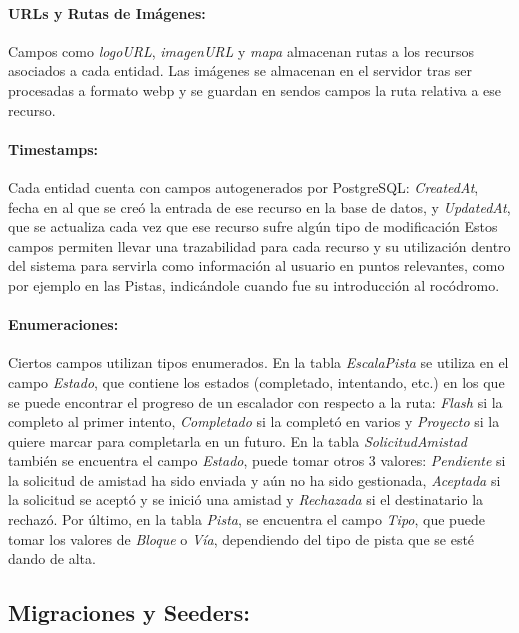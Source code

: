\paragraph{URLs y Rutas de Imágenes:} Campos como \textit{logoURL}, \textit{imagenURL} y \textit{mapa} almacenan 
rutas a los recursos asociados a cada entidad. Las imágenes se almacenan en el servidor tras ser procesadas 
a formato webp y se guardan en sendos campos la ruta relativa a ese recurso.

\paragraph{Timestamps:} Cada entidad cuenta con campos autogenerados por PostgreSQL: \textit{CreatedAt}, fecha en al que se creó la entrada de ese
recurso en la base de datos, y  \textit{UpdatedAt}, que se actualiza cada vez que ese recurso sufre algún tipo de modificación Estos campos permiten llevar una 
trazabilidad para cada recurso y su utilización dentro del sistema para servirla como información al usuario en puntos relevantes, como por ejemplo en las Pistas, 
indicándole cuando fue su introducción al rocódromo.

\paragraph{Enumeraciones:} Ciertos campos utilizan tipos enumerados. En la tabla \textit{EscalaPista} se utiliza en el campo \textit{Estado}, que contiene los estados  (completado, intentando, etc.) 
en los que se puede encontrar el progreso de un escalador con respecto a la ruta: \textit{Flash} si la completo al primer intento, \textit{Completado} si la completó en varios
y \textit{Proyecto} si la quiere marcar para completarla en un futuro. En la tabla \textit{SolicitudAmistad} también se encuentra el campo \textit{Estado}, puede tomar otros 3 
valores: \textit{Pendiente} si la solicitud de amistad ha sido enviada y aún no ha sido gestionada, \textit{Aceptada} si la solicitud se aceptó y se inició una amistad 
y \textit{Rechazada} si el destinatario la rechazó. Por último, en la tabla \textit{Pista}, se encuentra el campo \textit{Tipo}, que puede tomar los valores de 
\textit{Bloque} o \textit{Vía}, dependiendo del tipo de pista que se esté dando de alta.

\subsection{Migraciones y Seeders:}


